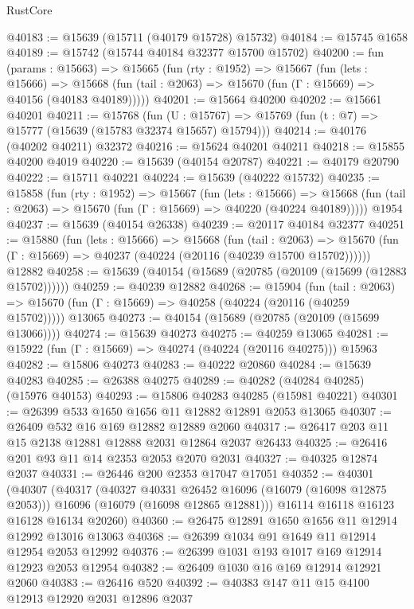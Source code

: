 \begin{lexlean}{RustCore}
\begin{coremodule}
@40183 := @15639 (@15711 (@40179 @15728) @15732)
@40184 := @15745 @1658
@40189 := @15742 (@15744 @40184 @32377 @15700 @15702)
@40200 := fun (params : @15663) =>
  @15665
    (fun (rty : @1952) =>
    @15667
      (fun (lets : @15666) =>
      @15668 (fun (tail : @2063) => @15670 (fun (Γ : @15669) => @40156 (@40183 @40189)))))
@40201 := @15664 @40200
@40202 := @15661 @40201
@40211 := @15768
    (fun (U : @15767) => @15769 (fun (t : @7) => @15777 (@15639 (@15783 @32374 @15657) @15794)))
@40214 := @40176 (@40202 @40211) @32372
@40216 := @15624 @40201 @40211
@40218 := @15855 @40200 @4019
@40220 := @15639 (@40154 @20787)
@40221 := @40179 @20790
@40222 := @15711 @40221
@40224 := @15639 (@40222 @15732)
@40235 := @15858
    (fun (rty : @1952) =>
    @15667
      (fun (lets : @15666) =>
      @15668 (fun (tail : @2063) => @15670 (fun (Γ : @15669) => @40220 (@40224 @40189)))))
    @1954
@40237 := @15639 (@40154 @26338)
@40239 := @20117 @40184 @32377
@40251 := @15880
    (fun (lets : @15666) =>
    @15668
      (fun (tail : @2063) =>
      @15670 (fun (Γ : @15669) => @40237 (@40224 (@20116 (@40239 @15700 @15702))))))
    @12882
@40258 := @15639 (@40154 (@15689 (@20785 (@20109 (@15699 (@12883 @15702))))))
@40259 := @40239 @12882
@40268 := @15904
    (fun (tail : @2063) => @15670 (fun (Γ : @15669) => @40258 (@40224 (@20116 (@40259 @15702)))))
    @13065
@40273 := @40154 (@15689 (@20785 (@20109 (@15699 @13066))))
@40274 := @15639 @40273
@40275 := @40259 @13065
@40281 := @15922 (fun (Γ : @15669) => @40274 (@40224 (@20116 @40275))) @15963
@40282 := @15806 @40273
@40283 := @40222 @20860
@40284 := @15639 @40283
@40285 := @26388 @40275
@40289 := @40282 (@40284 @40285) (@15976 @40153)
@40293 := @15806 @40283 @40285 (@15981 @40221)
@40301 := @26399 @533 @1650 @1656 @11 @12882 @12891 @2053 @13065
@40307 := @26409 @532 @16 @169 @12882 @12889 @2060
@40317 := @26417 @203 @11 @15 @2138 @12881 @12888 @2031 @12864 @2037 @26433
@40325 := @26416 @201 @93 @11 @14 @2353 @2053 @2070 @2031
@40327 := @40325 @12874 @2037
@40331 := @26446 @200 @2353 @17047 @17051
@40352 := @40301
    (@40307
      (@40317
        (@40327 @40331 @26452 @16096 (@16079 (@16098 @12875 @2053)))
        @16096
        (@16079 (@16098 @12865 @12881)))
      @16114
      @16118
      @16123
      @16128
      @16134
      @20260)
@40360 := @26475 @12891 @1650 @1656 @11 @12914 @12992 @13016 @13063
@40368 := @26399 @1034 @91 @1649 @11 @12914 @12954 @2053 @12992
@40376 := @26399 @1031 @193 @1017 @169 @12914 @12923 @2053 @12954
@40382 := @26409 @1030 @16 @169 @12914 @12921 @2060
@40383 := @26416 @520
@40392 := @40383 @147 @11 @15 @4100 @12913 @12920 @2031 @12896 @2037

\end{coremodule}
\end{lexlean}

